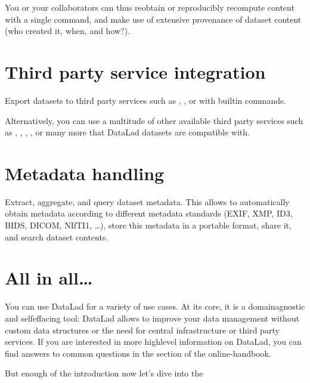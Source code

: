 \begin{figure}[tbp]
\centering

\noindent{}
\end{figure}

\sphinxAtStartPar
You or your collaborators can thus reobtain or reproducibly recompute content
with a single command, and make use of extensive provenance of dataset content
(who created it, when, and how?).


\section{Third party service integration}
\label{\detokenize{intro/executive_summary:third-party-service-integration}}
\sphinxAtStartPar
Export datasets to third party services such as
, , or
 with built\sphinxhyphen{}in commands.

\begin{figure}[tbp]
\centering

\noindent{}
\end{figure}

\sphinxAtStartPar
Alternatively, you can use a multitude of other available third party services such as
, ,
, ,
or many more that DataLad datasets are compatible with.


\section{Metadata handling}
\label{\detokenize{intro/executive_summary:metadata-handling}}
\sphinxAtStartPar
Extract, aggregate, and query dataset metadata. This allows to automatically obtain
metadata according to different metadata standards (EXIF, XMP, ID3, BIDS, DICOM,
NIfTI1, …), store this metadata in a portable format, share it, and search dataset
contents.

\begin{figure}[tbp]
\centering

\noindent{}
\end{figure}


\section{All in all…}
\label{\detokenize{intro/executive_summary:all-in-all}}
\sphinxAtStartPar
You can use DataLad for a variety of use cases. At its core, it is a domain\sphinxhyphen{}agnostic
and self\sphinxhyphen{}effacing tool: DataLad allows to improve your data management without
custom data structures or the need for central infrastructure or third party
services.
If you are interested in more high\sphinxhyphen{}level information on DataLad, you can find
answers to common questions in the section  of the online-handbook.

\sphinxAtStartPar
But enough of the introduction now \textendash{} let’s dive into the

\sphinxstepscope


